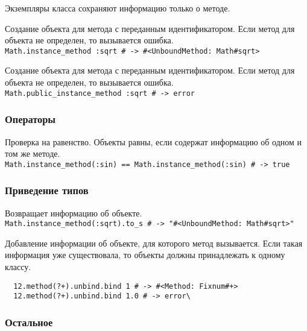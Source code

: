 Экземпляры класса сохраняют информацию только о методе.

\begin{methodlist}
  Создание объекта для метода с переданным идентификатором. Если метод для объекта не определен, то вызывается ошибка. 
  \\\verb!Math.instance_method :sqrt # -> #<UnboundMethod: Math#sqrt>!
 
  Создание объекта для метода с переданным идентификатором. Если метод для объекта не определен, то вызывается ошибка.
  \\\verb!Math.public_instance_method :sqrt # -> error!
\end{methodlist}

\subsubsection*{Операторы}

\begin{methodlist}
  Проверка на равенство. Объекты равны, если содержат информацию об одном и том же методе.
  \\\verb!Math.instance_method(:sin) == Math.instance_method(:sin) # -> true!
\end{methodlist}

\subsubsection*{Приведение типов}

\begin{methodlist}
  Возвращает информацию об объекте.
  \\\verb!Math.instance_method(:sqrt).to_s # -> "#<UnboundMethod: Math#sqrt>"!

  Добавление информации об объекте, для которого метод вызывается. Если такая информация уже существовала, то объекты должны принадлежать к одному классу.
  \begin{verbatim}
  12.method(?+).unbind.bind 1 # -> #<Method: Fixnum#+>
  12.method(?+).unbind.bind 1.0 # -> error\
  \end{verbatim}  
\end{methodlist}

\subsubsection*{Остальное}

